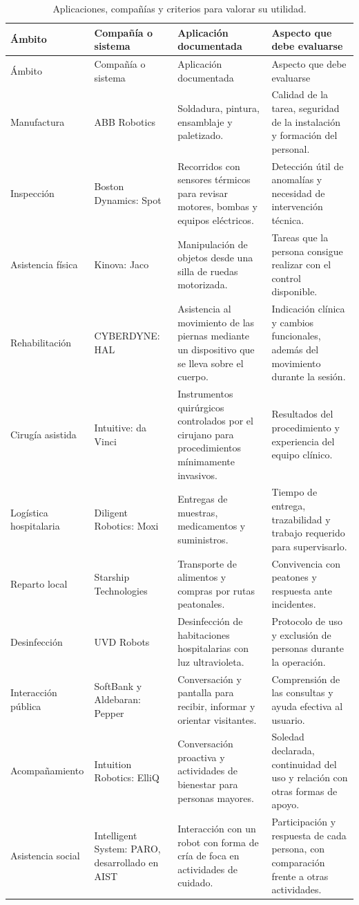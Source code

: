 \documentclass[11pt,a4paper]{article}
\begin{document}
\begingroup
\small
\setlength{\tabcolsep}{4pt}
\begin{longtable}{P{2.8cm}P{3.1cm}P{4.3cm}P{4.7cm}}
\caption{Aplicaciones, compañías y criterios para valorar su utilidad.}\label{tab:casos}\\
\toprule
Ámbito & Compañía o sistema & Aplicación documentada & Aspecto que debe evaluarse \\
\midrule
\endfirsthead
\toprule
Ámbito & Compañía o sistema & Aplicación documentada & Aspecto que debe evaluarse \\
\midrule
\endhead
\bottomrule
\endfoot
Manufactura & ABB Robotics & Soldadura, pintura, ensamblaje y paletizado.\cite{abb} & Calidad de la tarea, seguridad de la instalación y formación del personal. \\
Inspección & Boston Dynamics: Spot & Recorridos con sensores térmicos para revisar motores, bombas y equipos eléctricos.\cite{spot} & Detección útil de anomalías y necesidad de intervención técnica. \\
Asistencia física & Kinova: Jaco & Manipulación de objetos desde una silla de ruedas motorizada.\cite{jaco} & Tareas que la persona consigue realizar con el control disponible. \\
Rehabilitación & CYBERDYNE: HAL & Asistencia al movimiento de las piernas mediante un dispositivo que se lleva sobre el cuerpo.\cite{hal} & Indicación clínica y cambios funcionales, además del movimiento durante la sesión. \\
Cirugía asistida & Intuitive: da Vinci & Instrumentos quirúrgicos controlados por el cirujano para procedimientos mínimamente invasivos.\cite{intuitive,fda} & Resultados del procedimiento y experiencia del equipo clínico. \\
Logística hospitalaria & Diligent Robotics: Moxi & Entregas de muestras, medicamentos y suministros.\cite{moxi} & Tiempo de entrega, trazabilidad y trabajo requerido para supervisarlo. \\
Reparto local & Starship Technologies & Transporte de alimentos y compras por rutas peatonales.\cite{starshipfaq} & Convivencia con peatones y respuesta ante incidentes. \\
Desinfección & UVD Robots & Desinfección de habitaciones hospitalarias con luz ultravioleta.\cite{uvdinicio} & Protocolo de uso y exclusión de personas durante la operación. \\
Interacción pública & SoftBank y Aldebaran: Pepper & Conversación y pantalla para recibir, informar y orientar visitantes.\cite{pepper} & Comprensión de las consultas y ayuda efectiva al usuario. \\
Acompañamiento & Intuition Robotics: ElliQ & Conversación proactiva y actividades de bienestar para personas mayores.\cite{elliq} & Soledad declarada, continuidad del uso y relación con otras formas de apoyo. \\
Asistencia social & Intelligent System: PARO, desarrollado en AIST & Interacción con un robot con forma de cría de foca en actividades de cuidado.\cite{aist,paroensayo} & Participación y respuesta de cada persona, con comparación frente a otras actividades. \\
\end{longtable}
\endgroup
\end{document}
